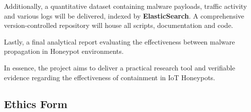 \documentclass[a4paper,12pt,oneside]{book}			%
\begin{document}
Additionally, a quantitative dataset containing malware payloads, traffic activity and various logs will be delivered, indexed by \textbf{ElasticSearch}. A comprehensive version-controlled repository will house all scripts, documentation and code.

Lastly, a final analytical report evaluating the effectiveness between malware propagation in Honeypot environments.

In essence, the project aims to deliver a practical research tool and verifiable evidence regarding the effectiveness of containment in IoT Honeypots.


\printbibliography

\begin{appendix}
\chapter{Ethics Form}\label{ch:ethics}

\end{appendix}
\end{document}
